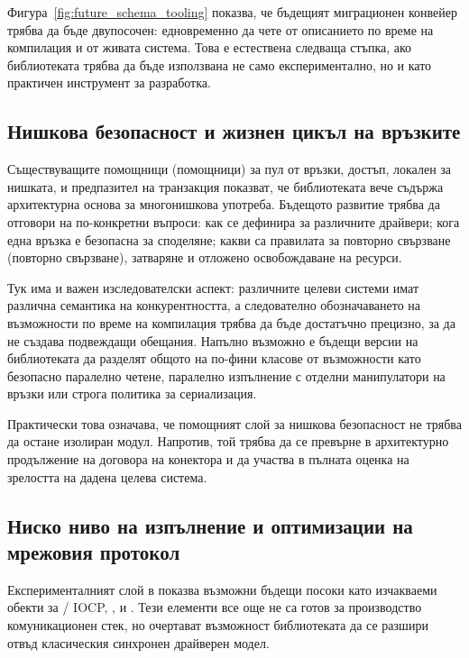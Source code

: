 Фигура~\ref{fig:future_schema_tooling} показва, че бъдещият миграционен конвейер трябва да бъде двупосочен: едновременно да чете от описанието по време на компилация и от живата система. Това е естествена следваща стъпка, ако библиотеката трябва да бъде използвана не само експериментално, но и като практичен инструмент за разработка.

\subsection{Нишкова безопасност и жизнен цикъл на връзките}

Съществуващите помощници (помощници) за пул от връзки, достъп, локален за нишката, и предпазител на транзакция показват, че библиотеката вече съдържа архитектурна основа за многонишкова употреба. Бъдещото развитие трябва да отговори на по-конкретни въпроси: как се дефинира  за различните драйвери; кога една връзка е безопасна за споделяне; какви са правилата за повторно свързване (повторно свързване), затваряне и отложено освобождаване на ресурси.

Тук има и важен изследователски аспект: различните целеви системи имат различна семантика на конкурентността, а следователно обозначаването на възможности по време на компилация трябва да бъде достатъчно прецизно, за да не създава подвеждащи обещания. Напълно възможно е бъдещи версии на библиотеката да разделят общото  на по-фини класове от възможности като безопасно паралелно четене, паралелно изпълнение с отделни манипулатори на връзки или строга политика за сериализация.

Практически това означава, че помощният слой за нишкова безопасност не трябва да остане изолиран модул. Напротив, той трябва да се превърне в архитектурно продължение на договора на конектора и да участва в пълната оценка на зрелостта на дадена целева система.

\subsection{Ниско ниво на изпълнение и оптимизации на мрежовия протокол}

Експерименталният слой в  показва възможни бъдещи посоки като изчакваеми обекти за  / IOCP, ,  и . Тези елементи все още не са готов за производство комуникационен стек, но очертават възможност библиотеката да се разшири отвъд класическия синхронен драйверен модел.

